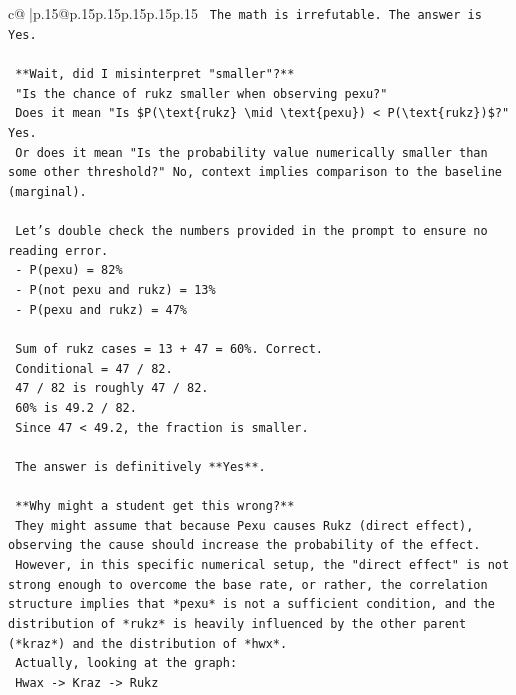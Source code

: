 \documentclass{article}
\begin{document}
{\begin{supertabular}{c@{$\;$}|p{.15\linewidth}@{}p{.15\linewidth}p{.15\linewidth}p{.15\linewidth}p{.15\linewidth}p{.15\linewidth}}
{{{\texttt{    The math is irrefutable. The answer is Yes.} \\
\\ 
\texttt{    **Wait, did I misinterpret "smaller"?**} \\
\texttt{    "Is the chance of rukz smaller when observing pexu?"} \\
\texttt{    Does it mean "Is \$P(\textbackslash{}text\{rukz\} \textbackslash{}mid \textbackslash{}text\{pexu\}) < P(\textbackslash{}text\{rukz\})\$?" Yes.} \\
\texttt{    Or does it mean "Is the probability value numerically smaller than some other threshold?" No, context implies comparison to the baseline (marginal).} \\
\\ 
\texttt{    Let's double check the numbers provided in the prompt to ensure no reading error.} \\
\texttt{    {-} P(pexu) = 82\%} \\
\texttt{    {-} P(not pexu and rukz) = 13\%} \\
\texttt{    {-} P(pexu and rukz) = 47\%} \\
\\ 
\texttt{    Sum of rukz cases = 13 + 47 = 60\%. Correct.} \\
\texttt{    Conditional = 47 / 82.} \\
\texttt{    47 / 82 is roughly 47 / 82.} \\
\texttt{    60\% is 49.2 / 82.} \\
\texttt{    Since 47 < 49.2, the fraction is smaller.} \\
\\ 
\texttt{    The answer is definitively **Yes**.} \\
\\ 
\texttt{    **Why might a student get this wrong?**} \\
\texttt{    They might assume that because Pexu causes Rukz (direct effect), observing the cause should increase the probability of the effect.} \\
\texttt{    However, in this specific numerical setup, the "direct effect" is not strong enough to overcome the base rate, or rather, the correlation structure implies that *pexu* is not a sufficient condition, and the distribution of *rukz* is heavily influenced by the other parent (*kraz*) and the distribution of *hwx*.} \\
\texttt{    Actually, looking at the graph:} \\
\texttt{    Hwax {-}> Kraz {-}> Rukz} \\
}}}
\end{supertabular}}
\end{document}
